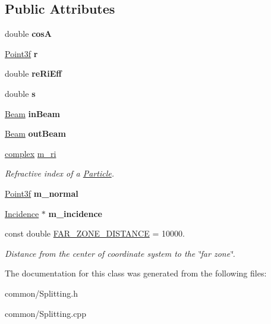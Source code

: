 \subsection*{Public Attributes}
\begin{DoxyCompactItemize}
\item 
\mbox{\label{class_splitting_a5ad3670ea5bad3271257b1a1b172c6e2}} 
double {\bfseries cosA}
\item 
\mbox{\label{class_splitting_a51fbaaebc6e331b2b63badf58b4f26f4}} 
\mbox{\hyperlink{struct_point3f}{Point3f}} {\bfseries r}
\item 
\mbox{\label{class_splitting_a9c3cf49e0ec2a19786559201f336218a}} 
double {\bfseries re\+Ri\+Eff}
\item 
\mbox{\label{class_splitting_abf2b5dd1827d171541ca0b4b61f3bd51}} 
double {\bfseries s}
\item 
\mbox{\label{class_splitting_adb288b7319755e4333284b4216beffcd}} 
\mbox{\hyperlink{class_beam}{Beam}} {\bfseries in\+Beam}
\item 
\mbox{\label{class_splitting_af898997a89ace94a278f1e67427e6aaf}} 
\mbox{\hyperlink{class_beam}{Beam}} {\bfseries out\+Beam}
\item 
\mbox{\label{class_splitting_a6a42f8997eeb3f7bd6c7aaf7b5744a23}} 
\mbox{\hyperlink{classcomplex}{complex}} \mbox{\hyperlink{class_splitting_a6a42f8997eeb3f7bd6c7aaf7b5744a23}{m\+\_\+ri}}
\begin{DoxyCompactList}\small\item\em Refractive index of a \mbox{\hyperlink{class_particle}{Particle}}. \end{DoxyCompactList}\item 
\mbox{\label{class_splitting_a28d7c420adda7a82dd53a2ba71a5fd59}} 
\mbox{\hyperlink{struct_point3f}{Point3f}} {\bfseries m\+\_\+normal}
\item 
\mbox{\label{class_splitting_a9f2a68b14bf9a4069453b2f04451dec1}} 
\mbox{\hyperlink{class_incidence}{Incidence}} $\ast$ {\bfseries m\+\_\+incidence}
\item 
\mbox{\label{class_splitting_a414e93aea45af1e8ce0cebcfb977a077}} 
const double \mbox{\hyperlink{class_splitting_a414e93aea45af1e8ce0cebcfb977a077}{F\+A\+R\+\_\+\+Z\+O\+N\+E\+\_\+\+D\+I\+S\+T\+A\+N\+CE}} = 10000.
\begin{DoxyCompactList}\small\item\em Distance from the center of coordinate system to the \char`\"{}far zone\char`\"{}. \end{DoxyCompactList}\end{DoxyCompactItemize}


The documentation for this class was generated from the following files\+:\begin{DoxyCompactItemize}
\item 
common/Splitting.\+h\item 
common/Splitting.\+cpp\end{DoxyCompactItemize}
